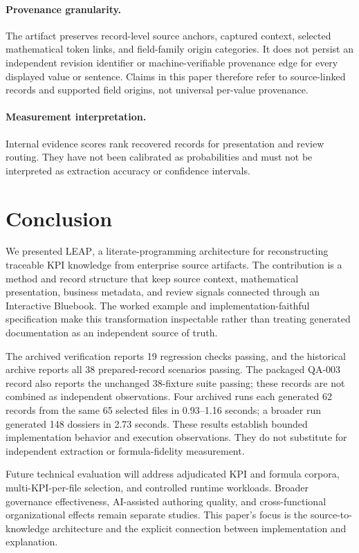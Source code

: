 \documentclass[a4paper,fleqn]{cas-dc}
\newcommand{\tool}{\textsc{LEAP}}
\begin{document}
\paragraph{Provenance granularity.}
The artifact preserves record-level source anchors, captured context, selected mathematical token links, and field-family origin categories. It does not persist an independent revision identifier or machine-verifiable provenance edge for every displayed value or sentence. Claims in this paper therefore refer to source-linked records and supported field origins, not universal per-value provenance.

\paragraph{Measurement interpretation.}
Internal evidence scores rank recovered records for presentation and review routing. They have not been calibrated as probabilities and must not be interpreted as extraction accuracy or confidence intervals.

\section{Conclusion}

We presented \tool{}, a literate-programming architecture for reconstructing traceable KPI knowledge from enterprise source artifacts. The contribution is a method and record structure that keep source context, mathematical presentation, business metadata, and review signals connected through an Interactive Bluebook. The worked example and implementation-faithful specification make this transformation inspectable rather than treating generated documentation as an independent source of truth.

The archived verification reports 19 regression checks passing, and the historical archive reports all 38 prepared-record scenarios passing. The packaged QA-003 record also reports the unchanged 38-fixture suite passing; these records are not combined as independent observations. Four archived runs each generated 62 records from the same 65 selected files in 0.93--1.16 seconds; a broader run generated 148 dossiers in 2.73 seconds. These results establish bounded implementation behavior and execution observations. They do not substitute for independent extraction or formula-fidelity measurement.

Future technical evaluation will address adjudicated KPI and formula corpora, multi-KPI-per-file selection, and controlled runtime workloads. Broader governance effectiveness, AI-assisted authoring quality, and cross-functional organizational effects remain separate studies. This paper's focus is the source-to-knowledge architecture and the explicit connection between implementation and explanation.
\end{document}
